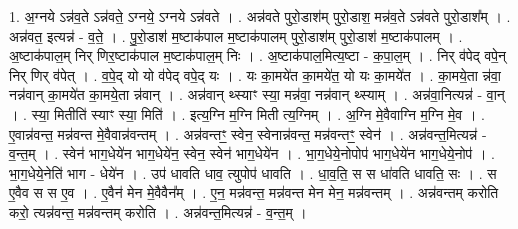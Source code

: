 \documentclass[17pt]{extarticle}
\begin{document}
1. अ॒ग्नये ऽन्न॑व॒ते ऽन्न॑वते॒ ऽग्नये॒ ऽग्नये ऽन्न॑वते । . अन्न॑वते पुरो॒डाश॑म् पुरो॒डाश॒ मन्न॑व॒ते ऽन्न॑वते पुरो॒डाश᳚म् । . अन्न॑वत॒ इत्यन्न॑ - व॒ते॒ । . पु॒रो॒डाश॑ म॒ष्टाक॑पाल म॒ष्टाक॑पालम् पुरो॒डाश॑म् पुरो॒डाश॑ म॒ष्टाक॑पालम् । . अ॒ष्टाक॑पाल॒म् निर् णिर॒ष्टाक॑पाल म॒ष्टाक॑पाल॒म् निः । . अ॒ष्टाक॑पाल॒मित्य॒ष्टा - क॒पा॒ल॒म् । . निर् व॑पेद् वपे॒न् निर् णिर् व॑पेत् । . व॒पे॒द् यो यो व॑पेद् वपे॒द् यः । . यः का॒मये॑त का॒मये॑त॒ यो यः का॒मये॑त । . का॒मये॒ता न्न॑वा॒ नन्न॑वान् का॒मये॑त का॒मये॒ता न्न॑वान् । . अन्न॑वान् थ्स्याꣳ स्या॒ मन्न॑वा॒ नन्न॑वान् थ्स्याम् । . अन्न॑वा॒नित्यन्न॑ - वा॒न् । . स्या॒ मितीति॑ स्याꣳ स्या॒ मिति॑ । . इत्य॒ग्नि म॒ग्नि मिती त्य॒ग्निम् । . अ॒ग्नि मे॒वैवाग्नि म॒ग्नि मे॒व । . ए॒वान्न॑वन्त॒ मन्न॑वन्त मे॒वैवान्न॑वन्तम् । . अन्न॑वन्तꣳ॒॒ स्वेन॒ स्वेनान्न॑वन्त॒ मन्न॑वन्तꣳ॒॒ स्वेन॑ । . अन्न॑वन्त॒मित्यन्न॑ - व॒न्त॒म् । . स्वेन॑ भाग॒धेये॑न भाग॒धेये॑न॒ स्वेन॒ स्वेन॑ भाग॒धेये॑न । . भा॒ग॒धेये॒नोपोप॑ भाग॒धेये॑न भाग॒धेये॒नोप॑ । . भा॒ग॒धेये॒नेति॑ भाग - धेये॑न । . उप॑ धावति धाव॒ त्युपोप॑ धावति । . धा॒व॒ति॒ स स धा॑वति धावति॒ सः । . स ए॒वैव स स ए॒व । . ए॒वैन॑ मेन मे॒वैवैन᳚म् । . ए॒न॒ मन्न॑वन्त॒ मन्न॑वन्त मेन मेन॒ मन्न॑वन्तम् । . अन्न॑वन्तम् करोति करो॒ त्यन्न॑वन्त॒ मन्न॑वन्तम् करोति । . अन्न॑वन्त॒मित्यन्न॑ - व॒न्त॒म् । \newline
\end{document}
